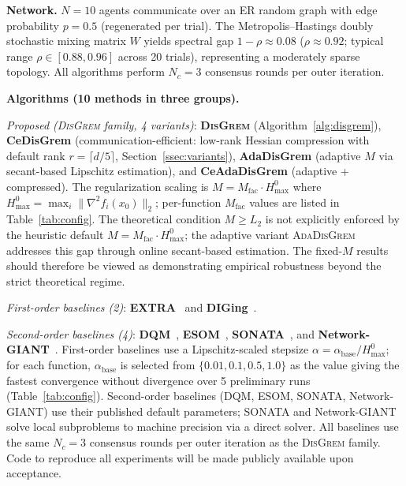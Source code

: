 \documentclass[11pt,a4paper]{article}
\begin{document}
	\noindent\textbf{Network.}
	$N{=}10$ agents communicate over an ER random graph
	with edge probability $p{=}0.5$ (regenerated per trial).
	The Metropolis--Hastings doubly stochastic mixing matrix $W$ yields
	spectral gap $1{-}\rho\approx 0.08$
	($\rho\approx 0.92$; typical range $\rho\in[0.88,0.96]$ across 20 trials),
	representing a moderately sparse topology.
	All algorithms perform $N_c{=}3$ consensus rounds per outer iteration.
	
	\noindent\textbf{Algorithms (10 methods in three groups).}
	
	\noindent\textit{Proposed (\textsc{DisGrem} family, 4 variants)}:
	\textbf{\textsc{DisGrem}} (Algorithm~\ref{alg:disgrem}),
	\textbf{CeDisGrem} (communication-efficient: low-rank Hessian compression
	with default rank $r{=}\lceil d/5\rceil$, Section~\ref{ssec:variants}),
	\textbf{AdaDisGrem} (adaptive $M$ via secant-based Lipschitz estimation),
	and \textbf{CeAdaDisGrem} (adaptive + compressed).
	The regularization scaling is $M = M_{\mathrm{fac}}\cdot H_{\max}^{0}$ where
	$H_{\max}^{0} = \max_i \|\nabla^2 f_i(x_0)\|_2$;
	per-function $M_{\mathrm{fac}}$ values are listed in Table~\ref{tab:config}.
	The theoretical condition $M\ge L_2$ is not explicitly
	enforced by the heuristic default $M=M_{\mathrm{fac}}\cdot H_{\max}^0$;
	the adaptive variant \textsc{AdaDisGrem} addresses this gap through
	online secant-based estimation.
	The fixed-$M$ results should therefore be viewed as demonstrating
	empirical robustness beyond the strict theoretical regime.
	
	\noindent\textit{First-order baselines (2)}:
	\textbf{EXTRA}~\citep{shi2015extra} and
	\textbf{DIGing}~\citep{nedic2017diging}.
	
	\noindent\textit{Second-order baselines (4)}:
	\textbf{DQM}~\citep{eisen2017dqn},
	\textbf{ESOM}~\citep{mokhtari2016esom},
	\textbf{SONATA}~\citep{sun2022sonata}, and
	\textbf{Network-GIANT}~\citep{ye2023networkgiant}.
	First-order baselines use a Lipschitz-scaled stepsize
	$\alpha=\alpha_{\mathrm{base}}/H_{\max}^{0}$;
	for each function, $\alpha_{\mathrm{base}}$ is selected from
	$\{0.01, 0.1, 0.5, 1.0\}$ as the value giving the fastest
	convergence without divergence over 5 preliminary runs
	(Table~\ref{tab:config}).
	Second-order baselines (DQM, ESOM, SONATA, Network-GIANT) use their
	published default parameters; SONATA and Network-GIANT solve local
	subproblems to machine precision via a direct solver.
	All baselines use the same $N_c{=}3$ consensus rounds per outer
	iteration as the \textsc{DisGrem} family.
	Code to reproduce all experiments will be made publicly available
	upon acceptance.
	
\end{document}
